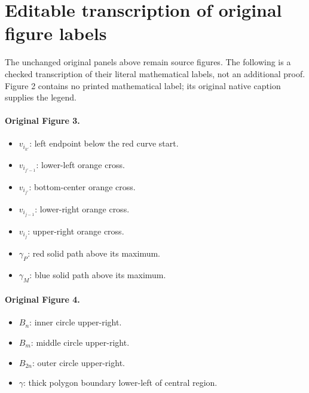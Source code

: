 \section*{Editable transcription of original figure labels}
\noindent The unchanged original panels above remain source figures. The following is a checked transcription of their literal mathematical labels, not an additional proof. Figure 2 contains no printed mathematical label; its original native caption supplies the legend.
\paragraph{Original Figure 3.}
\begin{itemize}
\item $v_{i_{k'}}$: left endpoint below the red curve start.
\item $v_{i_{j'-1}}$: lower-left orange cross.
\item $v_{i_{j'}}$: bottom-center orange cross.
\item $v_{i_{j-1}}$: lower-right orange cross.
\item $v_{i_j}$: upper-right orange cross.
\item $\gamma_P$: red solid path above its maximum.
\item $\gamma_M$: blue solid path above its maximum.
\end{itemize}
\paragraph{Original Figure 4.}
\begin{itemize}
\item $B_n$: inner circle upper-right.
\item $B_m$: middle circle upper-right.
\item $B_{2n}$: outer circle upper-right.
\item $\gamma$: thick polygon boundary lower-left of central region.
\end{itemize}
